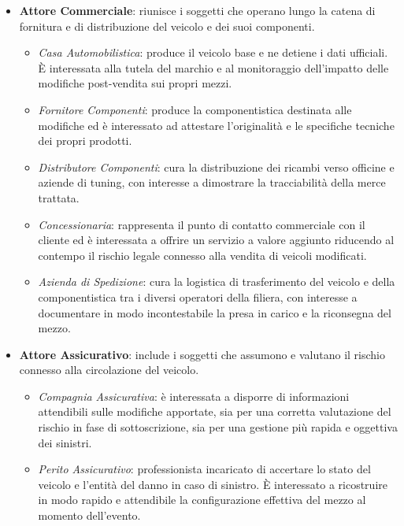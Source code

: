 \begin{itemize}
    \item \textbf{Attore Commerciale}: riunisce i soggetti che operano lungo la catena di fornitura e di distribuzione del veicolo e dei suoi componenti.
    \begin{itemize}
        \item \textit{Casa Automobilistica}: produce il veicolo base e ne detiene i dati ufficiali. \`E interessata alla tutela del marchio e al monitoraggio dell'impatto delle modifiche post-vendita sui propri mezzi.
        \item \textit{Fornitore Componenti}: produce la componentistica destinata alle modifiche ed \`e interessato ad attestare l'originalit\`a e le specifiche tecniche dei propri prodotti.
        \item \textit{Distributore Componenti}: cura la distribuzione dei ricambi verso officine e aziende di tuning, con interesse a dimostrare la tracciabilit\`a della merce trattata.
        \item \textit{Concessionaria}: rappresenta il punto di contatto commerciale con il cliente ed \`e interessata a offrire un servizio a valore aggiunto riducendo al contempo il rischio legale connesso alla vendita di veicoli modificati.
        \item \textit{Azienda di Spedizione}: cura la logistica di trasferimento del veicolo e della componentistica tra i diversi operatori della filiera, con interesse a documentare in modo incontestabile la presa in carico e la riconsegna del mezzo.
    \end{itemize}

    \item \textbf{Attore Assicurativo}: include i soggetti che assumono e valutano il rischio connesso alla circolazione del veicolo.
    \begin{itemize}
        \item \textit{Compagnia Assicurativa}: \`e interessata a disporre di informazioni attendibili sulle modifiche apportate, sia per una corretta valutazione del rischio in fase di sottoscrizione, sia per una gestione pi\`u rapida e oggettiva dei sinistri.
        \item \textit{Perito Assicurativo}: professionista incaricato di accertare lo stato del veicolo e l'entit\`a del danno in caso di sinistro. \`E interessato a ricostruire in modo rapido e attendibile la configurazione effettiva del mezzo al momento dell'evento.
    \end{itemize}


\end{itemize}
